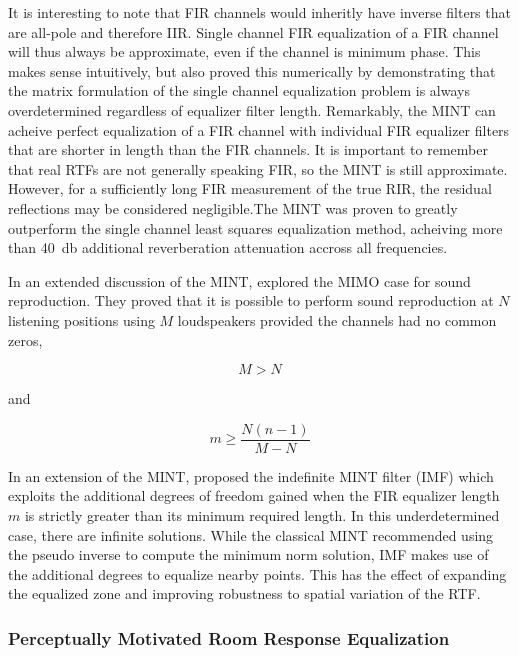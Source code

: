  It is interesting to note that FIR channels would inheritly have inverse filters that are all-pole and therefore IIR. Single channel FIR equalization of a FIR channel will thus always be approximate, even if the channel is minimum phase. This makes sense intuitively, but \cite{miyoshi1986inverse} also proved this numerically by demonstrating that the matrix formulation of the single channel equalization problem is always overdetermined regardless of equalizer filter length. Remarkably, the MINT can acheive perfect equalization of a FIR channel with individual FIR equalizer filters that are shorter in length than the FIR channels. It is important to remember that real RTFs are not generally speaking FIR, so the MINT is still approximate. However, for a sufficiently long FIR measurement of the true RIR, the residual reflections may be considered negligible.The MINT was proven to greatly outperform the single channel least squares equalization method, acheiving more than \qty{40}{\decibel} additional reverberation attenuation accross all frequencies.
 
In an extended discussion of the MINT,  \cite{miyoshi1988inverse} explored the MIMO case for sound reproduction. They proved that it is possible to perform sound reproduction at $N$ listening positions using $M$ loudspeakers provided the channels had no common zeros,

\begin{equation}
	M > N
\end{equation}

and

\begin{equation}
	m \ge \frac{N(n-1)}{M-N}
\end{equation}

In an extension of the MINT, \cite{nakajima1997sound} proposed the indefinite MINT filter (IMF) which exploits the additional degrees of freedom gained when the FIR equalizer length $m$ is strictly greater than its minimum required length. In this underdetermined case, there are infinite solutions. While the classical MINT recommended using the pseudo inverse to compute the minimum norm solution, IMF makes use of the additional degrees to equalize nearby points. This has the effect of expanding the equalized zone and improving robustness to spatial variation of the RTF.

\subsubsection{Perceptually Motivated Room Response Equalization}

